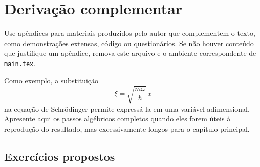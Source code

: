 \chapter{Derivação complementar}
\label{ap:derivacao}

Use apêndices para materiais produzidos pelo autor que complementem o texto,
como demonstrações extensas, código ou questionários. Se não houver conteúdo
que justifique um apêndice, remova este arquivo e o ambiente correspondente
de \texttt{main.tex}.

Como exemplo, a substituição
\[
  \xi = \sqrt{\frac{m\omega}{\hbar}}\,x
\]
na equação de Schrödinger permite expressá-la em uma variável adimensional.
Apresente aqui os passos algébricos completos quando eles forem úteis à
reprodução do resultado, mas excessivamente longos para o capítulo principal.

\section{Exercícios propostos}

